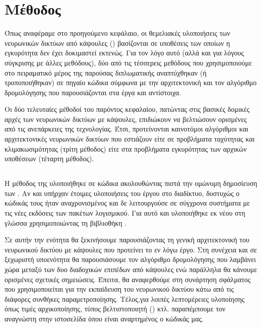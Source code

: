 \chapter{Μέθοδος}
\label{chap:method}

Όπως αναφέραμε στο προηγούμενο κεφάλαιο, οι θεμελιακές υλοποιήσεις των νευρωνικών δικτύων από κάψουλες (\cite{hinton2011transforming, sabour2017dynamic, hinton2018matrix}) βασίζονται σε υποθέσεις των οποίων η εγκυρότητα δεν έχει δοκιμαστεί εκτενώς. Για τον λόγο αυτό (αλλά και για λόγους σύγκρισης με άλλες μεθόδους), δύο από τις τέσσερεις μεθόδους που χρησιμοποιούμε στο πειραματικό μέρος της παρούσας διπλωματικής αναπτύχθηκαν (ή τροποποιήθηκαν) σε πηγαίο κώδικα σύμφωνα με την αρχιτεκτονική και τον αλγόριθμο δρομολόγησης που παρουσιάζονται στα έργα \cite{sabour2017dynamic} και \cite{hinton2018matrix} αντίστοιχα. \par

Οι δύο τελευταίες μέθοδοί του παρόντος κεφαλαίου, πατώντας στις βασικές δομικές αρχές των νευρωνικών δικτύων με κάψουλες, επιδιώκουν να βελτιώσουν ορισμένες από τις ανεπάρκειες της τεχνολογίας. Έτσι, προτείνονται καινοτόμοι αλγόριθμοι και αρχιτεκτονικές νευρωνικών δικτύων που εστιάζουν είτε σε προβλήματα ταχύτητας και κλιμακωσιμότητας (τρίτη μέθοδος) είτε στα προβλήματα εγκυρότητας των αρχικών υποθέσεων (τέταρτη μέθοδος).


\section{}

Η μέθοδος της  υλοποιήθηκε σε κώδικα ακολουθώντας πιστά την ομώνυμη δημοσίευση των  \cite{sabour2017dynamic}. Αν και υπήρχαν έτοιμες υλοποιήσεις του έργου στο διαδίκτυο, δυστυχώς ο κώδικάς τους ήταν αναχρονισμένος και δε λειτουργούσε σε σύγχρονα συστήματα με τις νέες εκδόσεις των πακέτων λογισμικού. Για αυτό και υλοποιήθηκε εκ νέου στη γλώσσα  χρησιμοποιώντας τη βιβλιοθήκη . \par

Σε αυτήν την ενότητα θα ξεκινήσουμε παρουσιάζοντας τη γενική αρχιτεκτονική του νευρωνικού δικτύου με κάψουλες που προτείνει το εν λόγω έργο. Στη συνέχεια και σε ξεχωριστή υπο\textendash ενότητα θα παρουσιάσουμε τον αλγόριθμο δρομολόγησης που λαμβάνει χώρα μεταξύ των δυο διαδοχικών επιπέδων από κάψουλες ενώ παράλληλα θα κάνουμε ορισμένες σχετικές σημειώσεις. Έπειτα, θα αναφερθούμε στη συνάρτηση σφάλματος που χρησιμοποιείται για την εκπαίδευση του νευρωνικού δικτύου κάτω από τις διάφορες συνθήκες παραμετροποίησης. Τέλος,για λοιπές λεπτομέρειες υλοποίησης όπως τιμές αρχικοποίησης, τύπος βελτιστοποιητή () κτλ. παραπέμπουμε τον αναγνώστη στην ιστοσελίδα όπου είναι αναρτημένος ο κώδικάς μας.

